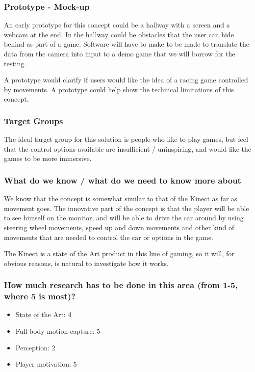 \subsubsection*{Prototype - Mock-up}
An early prototype for this concept could be a hallway with a screen and a webcam at the end. In the hallway could be obstacles that the user can hide behind as part of a game. Software will have to make to be made to translate the data from the camera into input to a demo game that we will borrow for the testing.
\bigskip

A prototype would clarify if users would like the idea of a racing game controlled by movements. A prototype could help show the technical limitations of this concept.


\subsubsection*{Target Groups}
The ideal target group for this solution is people who like to play games, but feel that the control options available are insufficient / uninspiring, and would like the games to be more immersive.


\subsubsection*{What do we know / what do we need to know more about}
We know that the concept is somewhat similar to that of the Kinect as far as movement goes. The innovative part of the concept is that the player will be able to see himself on the monitor, and will be able to drive the car around by using steering wheel movements, speed up and down movements and other kind of movements that are needed to control the car or options in the game.
\bigskip

The Kinect is a state of the Art product in this line of gaming, so it will, for obvious reasons, is natural to investigate how it works.


\subsubsection*{How much research has to be done in this area (from 1-5, where 5 is most)?}
\begin{itemize}
\item State of the Art: 4
\item Full body motion capture: 5
\item Perception: 2
\item Player motivation: 5
\end{itemize}


